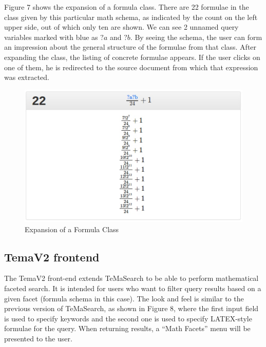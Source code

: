 \documentclass{deliverablereport}
\begin{document}
Figure 7 shows the expansion of a formula class. There are 22 formulae in the class given by this particular math schema, as indicated by the count on the left upper side, out of which only ten are shown. We can see 2 unnamed query variables marked with blue as $?a$ and $?b$. By seeing the schema, the user can form an impression about the general structure of the formulae from that class. After expanding the class, the listing of concrete formulae appears. If the user clicks on one of them, he is redirected to the source document from which that expression was extracted. \par

\begin{figure}[H]
\centering
 \includegraphics[scale=0.8]{figure7.jpg}
 \caption{Expansion of a Formula Class}
\end{figure}

\subsection{TemaV2 frontend}\label{v2}

The TemaV2 front-end extends TeMaSearch to be able to perform mathematical faceted search. It is intended for users who want to filter query results based on a given facet (formula schema in this case). The look and feel is similar to the previous version of TeMaSearch, as shown in Figure 8, where the first input field is used to specify keywords and the second one is used to specify LATEX-style formulae for the query. When returning results, a “Math Facets” menu will be presented to the user. \par
\end{document}

